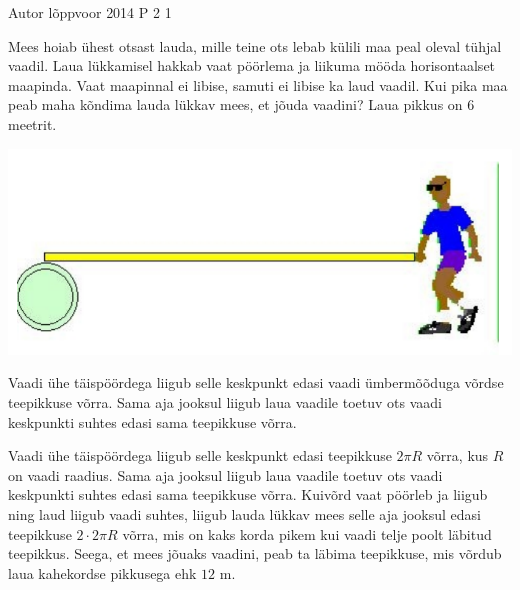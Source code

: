 {Autor} %
{lõppvoor} %
{2014} %
{P 2} %
{1} %
{

\ifStatement
 Mees hoiab ühest otsast lauda, mille teine ots lebab külili maa peal oleval tühjal vaadil. Laua lükkamisel hakkab vaat pöörlema ja liikuma mööda horisontaalset maapinda. Vaat maapinnal ei libise, samuti ei libise ka laud vaadil. Kui pika maa peab maha kõndima lauda lükkav mees, et jõuda vaadini? Laua pikkus on $6$ meetrit.
\begin{center}
	\includegraphics[width=0.5\linewidth]{2014-v3p-02-yl.PNG}
\end{center}
\fi

\ifHint
Vaadi ühe täispöördega liigub selle keskpunkt edasi vaadi ümbermõõduga võrdse teepikkuse võrra. Sama aja jooksul liigub laua vaadile toetuv ots vaadi keskpunkti suhtes edasi sama teepikkuse võrra. 
\fi

\ifSolution
Vaadi ühe täispöördega liigub selle keskpunkt edasi teepikkuse $ 2\pi  R$ võrra, kus $R$ on vaadi raadius. Sama aja jooksul liigub laua vaadile toetuv ots vaadi keskpunkti suhtes edasi sama teepikkuse võrra. Kuivõrd vaat pöörleb ja liigub ning laud liigub vaadi suhtes, liigub lauda lükkav mees selle aja jooksul edasi teepikkuse $2 \cdot 2 \pi R$ võrra, mis on kaks korda pikem kui vaadi telje poolt läbitud teepikkus. Seega, et mees jõuaks vaadini, peab ta läbima teepikkuse, mis võrdub laua kahekordse pikkusega ehk $12$ m.
\fi
}
